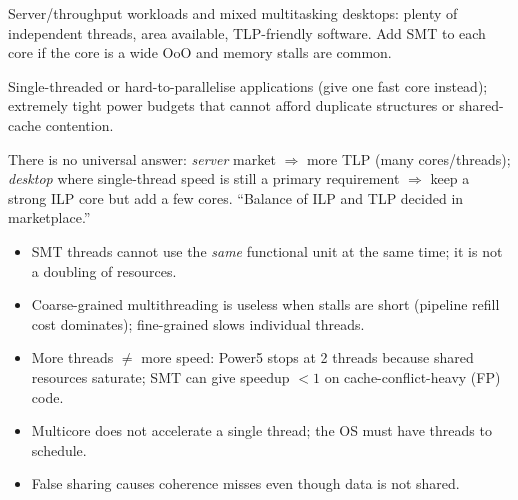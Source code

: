 \begin{pick}
Server/throughput workloads and mixed multitasking desktops: plenty of independent threads, area available, TLP-friendly software. Add SMT to each core if the core is a wide OoO and memory stalls are common.
\end{pick}
\begin{avoid}
Single-threaded or hard-to-parallelise applications (give one fast core instead); extremely tight power budgets that cannot afford duplicate structures or shared-cache contention.
\end{avoid}

\begin{dec}
There is no universal answer: \emph{server} market $\Rightarrow$ more TLP (many cores/threads); \emph{desktop} where single-thread speed is still a primary requirement $\Rightarrow$ keep a strong ILP core but add a few cores. ``Balance of ILP and TLP decided in marketplace.''
\end{dec}

\begin{trap}
\begin{itemize}
\item SMT threads cannot use the \emph{same} functional unit at the same time; it is not a doubling of resources.
\item Coarse-grained multithreading is useless when stalls are short (pipeline refill cost dominates); fine-grained slows individual threads.
\item More threads $\ne$ more speed: Power5 stops at 2 threads because shared resources saturate; SMT can give speedup $<1$ on cache-conflict-heavy (FP) code.
\item Multicore does not accelerate a single thread; the OS must have threads to schedule.
\item False sharing causes coherence misses even though data is not shared.
\end{itemize}
\end{trap}

